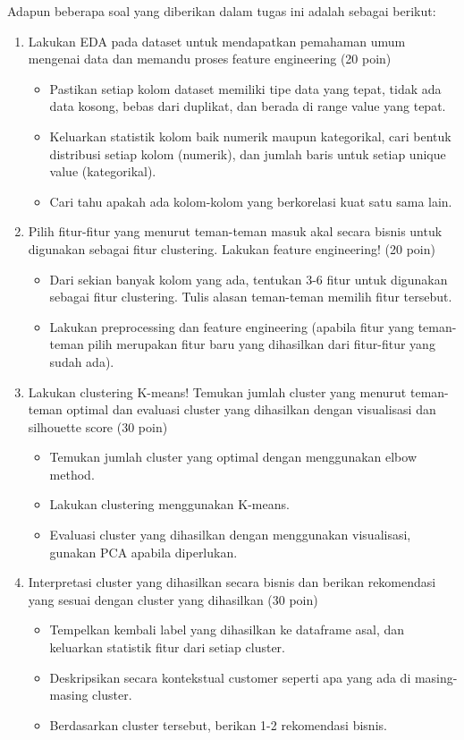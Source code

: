 Adapun beberapa soal yang diberikan dalam tugas ini adalah sebagai berikut:
\begin{enumerate}
    \item Lakukan EDA pada dataset untuk mendapatkan pemahaman umum mengenai data dan memandu proses feature engineering (20 poin)
    \begin{itemize}
        \item Pastikan setiap kolom dataset memiliki tipe data yang tepat, tidak ada data kosong, bebas dari duplikat, dan berada di range value yang tepat.
        \item Keluarkan statistik kolom baik numerik maupun kategorikal, cari bentuk distribusi setiap kolom (numerik), dan jumlah baris untuk setiap unique value (kategorikal).
        \item Cari tahu apakah ada kolom-kolom yang berkorelasi kuat satu sama lain.
    \end{itemize}
    
    \item Pilih fitur-fitur yang menurut teman-teman masuk akal secara bisnis untuk digunakan sebagai fitur clustering. Lakukan feature engineering! (20 poin)
    \begin{itemize}
        \item Dari sekian banyak kolom yang ada, tentukan 3-6 fitur untuk digunakan sebagai fitur clustering. Tulis alasan teman-teman memilih fitur tersebut.
        \item Lakukan preprocessing dan feature engineering (apabila fitur yang teman-teman pilih merupakan fitur baru yang dihasilkan dari fitur-fitur yang sudah ada).
    \end{itemize}
    
    \item Lakukan clustering K-means! Temukan jumlah cluster yang menurut teman-teman optimal dan evaluasi cluster yang dihasilkan dengan visualisasi dan silhouette score (30 poin)
    \begin{itemize}
        \item Temukan jumlah cluster yang optimal dengan menggunakan elbow method.
        \item Lakukan clustering menggunakan K-means.
        \item Evaluasi cluster yang dihasilkan dengan menggunakan visualisasi, gunakan PCA apabila diperlukan.
    \end{itemize}
    
    \item Interpretasi cluster yang dihasilkan secara bisnis dan berikan rekomendasi yang sesuai dengan cluster yang dihasilkan (30 poin)
    \begin{itemize}
        \item Tempelkan kembali label yang dihasilkan ke dataframe asal, dan keluarkan statistik fitur dari setiap cluster.
        \item Deskripsikan secara kontekstual customer seperti apa yang ada di masing-masing cluster.
        \item Berdasarkan cluster tersebut, berikan 1-2 rekomendasi bisnis.
    \end{itemize}
\end{enumerate}



